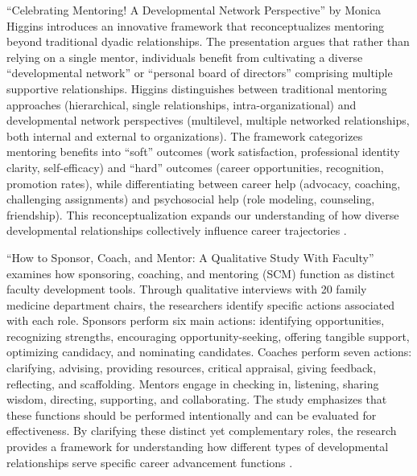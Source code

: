 \documentclass[main.tex]{subfiles}
\begin{document}
``Celebrating Mentoring! A Developmental Network Perspective'' by Monica Higgins introduces an innovative framework that reconceptualizes mentoring beyond traditional dyadic relationships. The presentation argues that rather than relying on a single mentor, individuals benefit from cultivating a diverse ``developmental network'' or ``personal board of directors'' comprising multiple supportive relationships. Higgins distinguishes between traditional mentoring approaches (hierarchical, single relationships, intra-organizational) and developmental network perspectives (multilevel, multiple networked relationships, both internal and external to organizations). The framework categorizes mentoring benefits into ``soft'' outcomes (work satisfaction, professional identity clarity, self-efficacy) and ``hard'' outcomes (career opportunities, recognition, promotion rates), while differentiating between career help (advocacy, coaching, challenging assignments) and psychosocial help (role modeling, counseling, friendship). This reconceptualization expands our understanding of how diverse developmental relationships collectively influence career trajectories \parencite{higgins2023celebrating}.

``How to Sponsor, Coach, and Mentor: A Qualitative Study With Faculty'' examines how sponsoring, coaching, and mentoring (SCM) function as distinct faculty development tools. Through qualitative interviews with 20 family medicine department chairs, the researchers identify specific actions associated with each role. Sponsors perform six main actions: identifying opportunities, recognizing strengths, encouraging opportunity-seeking, offering tangible support, optimizing candidacy, and nominating candidates. Coaches perform seven actions: clarifying, advising, providing resources, critical appraisal, giving feedback, reflecting, and scaffolding. Mentors engage in checking in, listening, sharing wisdom, directing, supporting, and collaborating. The study emphasizes that these functions should be performed intentionally and can be evaluated for effectiveness. By clarifying these distinct yet complementary roles, the research provides a framework for understanding how different types of developmental relationships serve specific career advancement functions \parencite{alachkar2023sponsor}.
\end{document}
